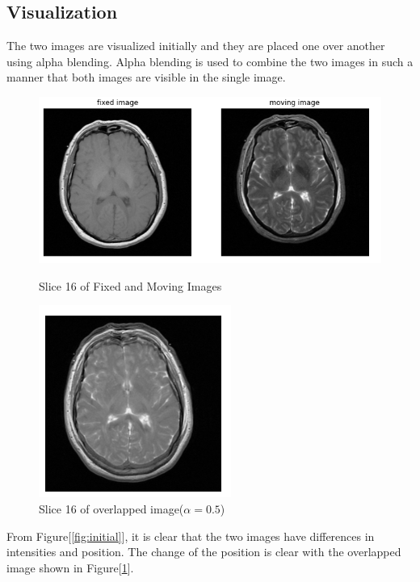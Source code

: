 \documentclass[11pt,english]{article}
\begin{document}
\subsection*{Visualization}
The two images are visualized initially and they are placed one over another using alpha blending. Alpha blending is used to combine the two images in such a manner that both images are visible in the single image.  
\begin{figure}[h!]
    \centering
    \begin{minipage}[b]{0.6\textwidth}
      \includegraphics[width = \textwidth]{images/initial.PNG}
      \caption{Slice 16 of Fixed and Moving Images}
      \label{fig:initial}
    \end{minipage}
    \begin{minipage}[b]{0.3\textwidth}
      \includegraphics[width = \textwidth]{images/initialOverlap.PNG}
      \caption{Slice 16 of overlapped image($\alpha=0.5$)}
      \label{fig:czchirp100}
    \end{minipage}
  \end{figure}
From Figure[\ref{fig:initial}], it is clear that the two images have differences in intensities and position. The change of the position is clear with the overlapped image shown in Figure[\ref{fig:czchirp100}].
\end{document}
